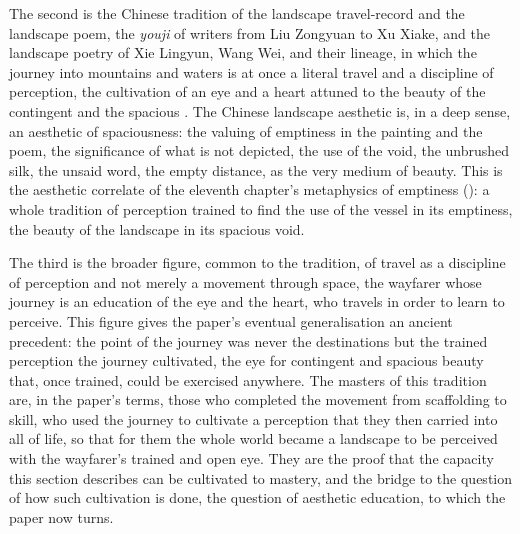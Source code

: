 The second is the Chinese tradition of the landscape travel-record and the landscape poem, the \emph{youji} of writers from Liu Zongyuan to Xu Xiake, and the landscape poetry of Xie Lingyun, Wang Wei, and their lineage, in which the journey into mountains and waters is at once a literal travel and a discipline of perception, the cultivation of an eye and a heart attuned to the beauty of the contingent and the spacious \parencite{owen1996}. The Chinese landscape aesthetic is, in a deep sense, an aesthetic of spaciousness: the valuing of emptiness in the painting and the poem, the significance of what is not depicted, the use of the void, the unbrushed silk, the unsaid word, the empty distance, as the very medium of beauty. This is the aesthetic correlate of the eleventh chapter's metaphysics of emptiness (): a whole tradition of perception trained to find the use of the vessel in its emptiness, the beauty of the landscape in its spacious void.

The third is the broader figure, common to the tradition, of travel as a discipline of perception and not merely a movement through space, the wayfarer whose journey is an education of the eye and the heart, who travels in order to learn to perceive. This figure gives the paper's eventual generalisation an ancient precedent: the point of the journey was never the destinations but the trained perception the journey cultivated, the eye for contingent and spacious beauty that, once trained, could be exercised anywhere. The masters of this tradition are, in the paper's terms, those who completed the movement from scaffolding to skill, who used the journey to cultivate a perception that they then carried into all of life, so that for them the whole world became a landscape to be perceived with the wayfarer's trained and open eye. They are the proof that the capacity this section describes can be cultivated to mastery, and the bridge to the question of how such cultivation is done, the question of aesthetic education, to which the paper now turns.
